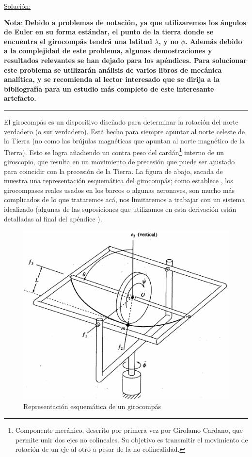 \documentclass[a4paper,10pt]{article}
\numberwithin{equation}{section}
\begin{document}
\vspace{.3cm}

\underline{Solución:} \vspace{.3cm}

\textbf{Nota}: \textbf{Debido a problemas de notación, ya que utilizaremos los 
ángulos de Euler en su forma estándar, el punto de la tierra donde
se encuentra el girocompás tendrá una latitud $\lambda$, y no $\phi$. Además
debido a la complejidad de este problema, algunas demostraciones y resultados relevantes 
se han dejado para los apéndices. Para solucionar este problema se utilizarán análisis 
de varios libros de mecánica analítica, y se recomienda al lector interesado que se dirija 
a la bibliografía para un estudio más completo de este interesante artefacto.}

\noindent\rule[0.5ex]{\linewidth}{1pt}

\vspace{.3cm}

El girocompás es un dispositivo diseñado para determinar la rotación del norte verdadero 
(o sur verdadero). Está hecho para siempre apuntar al norte celeste de la Tierra (no como 
las brújulas magnéticas que apuntan al norte magnético de la Tierra). Esto se logra 
añadiendo un contra peso del cardán\footnote{Componente mecánico, descrito por primera vez por Girolamo
Cardano, que permite unir dos ejes no colineales. Su objetivo es transmitir el movimiento de rotación de un
eje al otro a pesar de la no colinealidad.} interno de un giroscopio, que resulta en un 
movimiento de precesión que puede ser ajustado para coincidir con la precesión de 
la Tierra. La figura de abajo, sacada de \cite{baruh} muestra una representación 
esquemática del girocompás; como establece \cite{saletan}, los girocompases reales 
usados en los barcos o algunas aeronaves, son mucho más complicados de lo que trataremos 
acá, nos limitaremos a trabajar con un sistema idealizado (algunas de las suposiciones 
que utilizamos en esta derivación están detalladas al final del apéndice ).

\begin{figure}[H]
 \center 
 \includegraphics[scale=0.5]{problema3fig1}
 \caption{Representación esquemática de un girocompás}
 \label{fig:problema3fig1}
\end{figure}
\end{document}
